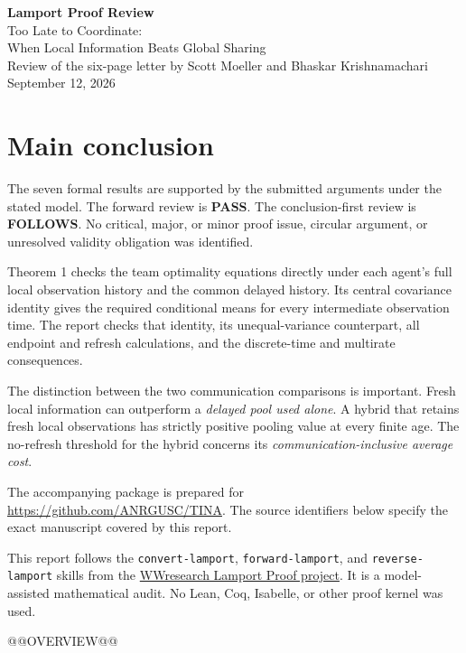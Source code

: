 \documentclass[11pt,letterpaper]{article}
\begin{document}
\begin{center}
{\Large\bfseries\textcolor{ink}{Lamport Proof Review}}\\[8pt]
{\large Too Late to Coordinate:\\
When Local Information Beats Global Sharing}\\[10pt]
{\normalsize Review of the six-page letter by Scott Moeller and Bhaskar Krishnamachari}\\[5pt]
September 12, 2026
\end{center}

\section*{Main conclusion}
The seven formal results are supported by the submitted arguments under the stated model. The forward review is \textbf{PASS}. The conclusion-first review is \textbf{FOLLOWS}. No critical, major, or minor proof issue, circular argument, or unresolved validity obligation was identified.

Theorem 1 checks the team optimality equations directly under each agent's full local observation history and the common delayed history. Its central covariance identity gives the required conditional means for every intermediate observation time. The report checks that identity, its unequal-variance counterpart, all endpoint and refresh calculations, and the discrete-time and multirate consequences.

The distinction between the two communication comparisons is important. Fresh local information can outperform a \emph{delayed pool used alone}. A hybrid that retains fresh local observations has strictly positive pooling value at every finite age. The no-refresh threshold for the hybrid concerns its \emph{communication-inclusive average cost}.

The accompanying package is prepared for \url{https://github.com/ANRGUSC/TINA}. The source identifiers below specify the exact manuscript covered by this report.

This report follows the \texttt{convert-lamport}, \texttt{forward-lamport}, and \texttt{reverse-lamport} skills from the \href{https://github.com/WWresearch/lamport-proof}{WWresearch Lamport Proof project}. It is a model-assisted mathematical audit. No Lean, Coq, Isabelle, or other proof kernel was used.

{\small @@OVERVIEW@@}

\clearpage
{\small\setlength{\parskip}{0pt}\tableofcontents}
\clearpage
\end{document}
